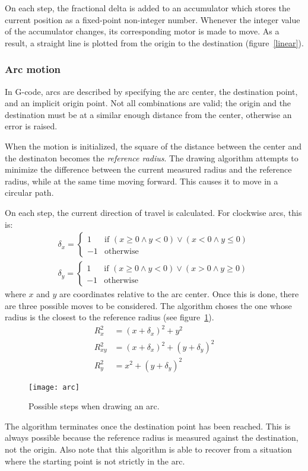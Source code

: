 On each step, the fractional delta is added to an accumulator which stores the
current position as a fixed-point non-integer number. Whenever the integer value
of the accumulator changes, its corresponding motor is made to move. As a
result, a straight line is plotted from the origin to the destination
(figure~\ref{linear}).

\subsubsection{Arc motion}

In G-code, arcs are described by specifying the arc center, the destination
point, and an implicit origin point. Not all combinations are valid; the origin
and the destination must be at a similar enough distance from the center,
otherwise an error is raised.

When the motion is initialized, the square of the distance between the center
and the destinaton becomes the \textit{reference radius}. The drawing algorithm
attempts to minimize the difference between the current measured radius and the
reference radius, while at the same time moving forward. This causes it to move
in a circular path.

On each step, the current direction of travel is calculated. For clockwise arcs,
this is:
\begin{gather*}
    \delta_x = \begin{cases}
        1 & \text{if } (x \geq 0 \land y < 0) \lor (x < 0 \land y \leq 0)\\
        -1 & \text{otherwise}
    \end{cases}
    \\
    \delta_y = \begin{cases}
        1 & \text{if } (x \geq 0 \land y < 0) \lor (x > 0 \land y \geq 0)\\
        -1 & \text{otherwise}
    \end{cases}
\end{gather*}
where $x$ and $y$ are coordinates relative to the arc center. Once this is done,
there are three possible moves to be considered. The algorithm choses the one
whose radius is the closest to the reference radius (see figure~\ref{arc}).
\begin{align*}
    R^2_x &= (x + \delta_x)^2 + y^2 \\
    R^2_{xy} &= (x + \delta_x)^2 + (y + \delta_y)^2 \\
    R^2_y &= x^2 + (y + \delta_y)^2
\end{align*}

\begin{figure}[ht]
    \begin{center}
        \texttt{[image: arc]}
        \caption{Possible steps when drawing an arc.}
        \label{arc}
    \end{center}
\end{figure}

The algorithm terminates once the destination point has been reached. This is
always possible because the reference radius is measured against the
destination, not the origin. Also note that this algorithm is able to recover
from a situation where the starting point is not strictly in the arc.
